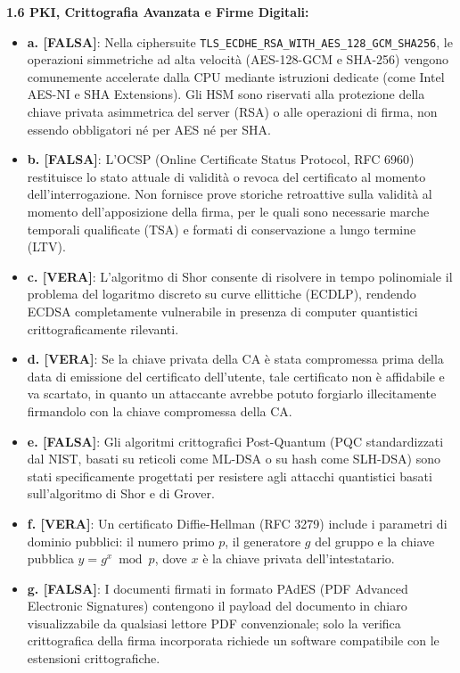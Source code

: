 \documentclass[11pt,a4paper]{article}
\begin{document}
\begin{solutionbox}
\textbf{1.6 PKI, Crittografia Avanzata e Firme Digitali:}
\begin{itemize}
    \item \textbf{a. [FALSA]}: Nella ciphersuite \texttt{TLS\_ECDHE\_RSA\_WITH\_AES\_128\_GCM\_SHA256}, le operazioni simmetriche ad alta velocità (AES-128-GCM e SHA-256) vengono comunemente accelerate dalla CPU mediante istruzioni dedicate (come Intel AES-NI e SHA Extensions). Gli HSM sono riservati alla protezione della chiave privata asimmetrica del server (RSA) o alle operazioni di firma, non essendo obbligatori né per AES né per SHA.
    \item \textbf{b. [FALSA]}: L'OCSP (Online Certificate Status Protocol, RFC 6960) restituisce lo stato attuale di validità o revoca del certificato al momento dell'interrogazione. Non fornisce prove storiche retroattive sulla validità al momento dell'apposizione della firma, per le quali sono necessarie marche temporali qualificate (TSA) e formati di conservazione a lungo termine (LTV).
    \item \textbf{c. [VERA]}: L'algoritmo di Shor consente di risolvere in tempo polinomiale il problema del logaritmo discreto su curve ellittiche (ECDLP), rendendo ECDSA completamente vulnerabile in presenza di computer quantistici crittograficamente rilevanti.
    \item \textbf{d. [VERA]}: Se la chiave privata della CA è stata compromessa prima della data di emissione del certificato dell'utente, tale certificato non è affidabile e va scartato, in quanto un attaccante avrebbe potuto forgiarlo illecitamente firmandolo con la chiave compromessa della CA.
    \item \textbf{e. [FALSA]}: Gli algoritmi crittografici Post-Quantum (PQC standardizzati dal NIST, basati su reticoli come ML-DSA o su hash come SLH-DSA) sono stati specificamente progettati per resistere agli attacchi quantistici basati sull'algoritmo di Shor e di Grover.
    \item \textbf{f. [VERA]}: Un certificato Diffie-Hellman (RFC 3279) include i parametri di dominio pubblici: il numero primo $p$, il generatore $g$ del gruppo e la chiave pubblica $y = g^x \bmod p$, dove $x$ è la chiave privata dell'intestatario.
    \item \textbf{g. [FALSA]}: I documenti firmati in formato PAdES (PDF Advanced Electronic Signatures) contengono il payload del documento in chiaro visualizzabile da qualsiasi lettore PDF convenzionale; solo la verifica crittografica della firma incorporata richiede un software compatibile con le estensioni crittografiche.

\end{itemize}
\end{solutionbox}
\end{document}

